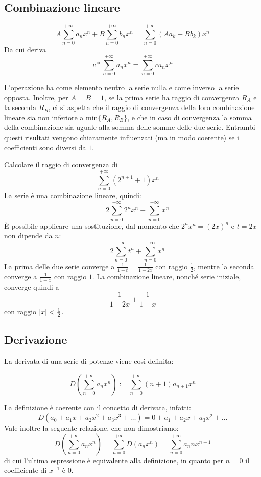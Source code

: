 \subsection{Combinazione lineare}
\begin{defin}
	\label{ser:comblin}
	\begin{equation}
		A\sum_{n=0}^{+\infty}a_n x^n+B\sum_{n=0}^{+\infty} b_nx^n=\sum_{n=0}^{+\infty} (Aa_k+Bb_k)x^n
	\end{equation}
	Da cui deriva
	\begin{equation}
		\label{eq:cperserie}
		c*\sum_{n=0}^{+\infty} a_nx^n=\sum_{n=0}^{+\infty}ca_nx^n
	\end{equation}
\end{defin}
L'operazione ha come elemento neutro la serie nulla e come inverso la serie opposta. Inoltre, per $A=B=1$, se la prima serie ha raggio di convergenza $R_A$ e la seconda $R_B$, ci si aspetta che il raggio di convergenza della loro combinazione lineare sia non inferiore a $\text{min}\{R_A,R_B\}$, e che in caso di convergenza la somma della combinazione sia uguale alla somma delle somme delle due serie. Entrambi questi risultati vengono chiaramente influenzati (ma in modo coerente) se i coefficienti sono diversi da $1$.

\begin{examp}
	Calcolare il raggio di convergenza di
	\[
		\sum_{n=0}^{+\infty}(2^{n+1}+1)x^n=
	\]
	La serie è una combinazione lineare, quindi:
	\[
		=2\sum_{n=0}^{+\infty}2^nx^n+\sum_{n=0}^{+\infty}x^n
	\]
	È possibile applicare una sostituzione, dal momento che $2^nx^n=(2x)^n$ e $t=2x$ non dipende da $n$:
	\[
		=2\sum_{n=0}^{+\infty}t^n+\sum_{n=0}^{+\infty}x^n
	\]
	La prima delle due serie converge a $\frac{1}{1-t}=\frac{1}{1-2x}$ con raggio $\frac{1}{2}$, mentre la seconda converge a $\frac{1}{1-x}$ con raggio $1$. La combinazione lineare, nonché serie iniziale, converge quindi a
	\[
		\frac{1}{1-2x}+\frac{1}{1-x}
	\]
	con raggio $\left\lvert x \right\rvert<\frac{1}{2}$.
\end{examp}


\subsection{Derivazione}
La derivata di una serie di potenze viene così definita:
\begin{defin}
	\[
		D\left(\sum_{n=0}^{+\infty} a_nx^n\right):=\sum_{n=0}^{+\infty}(n+1)a_{n+1}x^n
	\]
\end{defin}
La definizione è coerente con il concetto di derivata, infatti:
\[
	D(a_0+a_1x+a_2x^2+a_3x^3+\dots)=0+a_1+a_2x+a_3x^2+\dots
\]
Vale inoltre la seguente relazione, che non dimostriamo:
\[
	D\left(\sum_{n=0}^{+\infty} a_nx^n\right)=\sum_{n=0}^{+\infty}D(a_nx^n)=\sum_{n=0}^{+\infty}a_nnx^{n-1}
\]
di cui l'ultima espressione è equivalente alla definizione, in quanto per $n=0$ il coefficiente di $x^{-1}$ è $0$.

